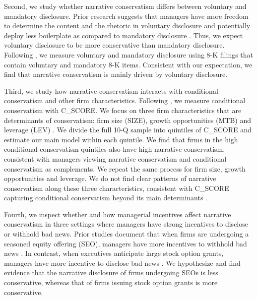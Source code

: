 \documentclass[letterpaper,11pt]{article}
\begin{document}
\begin{spacing}{1.5}
Second, we study whether narrative conservatism differs between voluntary and mandatory disclosure. Prior research suggests that managers have more freedom to determine the content and the rhetoric in voluntary disclosure and potentially deploy less boilerplate as compared to mandatory disclosure \cite{nelsonCarrotStickShift2016}. Thus, we expect voluntary disclosure to be more conservative than mandatory disclosure. Following , we measure voluntary and mandatory disclosure using 8-K filings that contain voluntary and mandatory 8-K items. Consistent with our expectation, we find that narrative conservatism is mainly driven by voluntary disclosure. 

Third, we study how narrative conservatism interacts with conditional conservatism and other firm characteristics. Following , we measure conditional conservatism with C\_SCORE. We focus on three firm characteristics that are determinants of conservatism: firm size (SIZE), growth opportunities (MTB) and leverage (LEV) \cite{wattsConservatismAccountingPart2003, qiangEffectsContractingLitigation2007, khanEstimationEmpiricalProperties2009, laraEconomicDeterminantsConditional2009}. We divide the full 10-Q sample into quintiles of C\_SCORE and estimate our main model within each quintile. We find that firms in the high conditional conservatism quintiles also have high narrative conservatism, consistent with managers viewing narrative conservatism and conditional conservatism as complements. We repeat the same process for firm size, growth opportunities and leverage. We do not find clear patterns of narrative conservatism along these three characteristics, consistent with C\_SCORE capturing conditional conservatism beyond its main determinants \cite{khanEstimationEmpiricalProperties2009}.

Fourth, we inspect whether and how managerial incentives affect narrative conservatism in three settings where managers have strong incentives to disclose or withhold bad news. Prior studies document that when firms are undergoing a seasoned equity offering (SEO), managers have more incentives to withhold bad news \cite{teohEarningsManagementUnderperformance1998, langVoluntaryDisclosureEquity2000}. In contrast, when executives anticipate large stock option grants, managers have more incentive to disclose bad news \cite{yermackGoodTimingCEO1997, aboodyCEOStockOption2000}. We hypothesize and find evidence that the narrative disclosure of firms undergoing SEOs is less conservative, whereas that of firms issuing stock option grants is more conservative.


\end{spacing}
\end{document}

